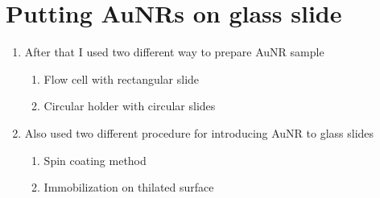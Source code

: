\documentclass[twoside,single]{lion-msc}
\begin{document}
  \section{Putting AuNRs on glass slide}
   \begin{enumerate}[I]
   \item After that I used two different way to prepare AuNR sample
   \begin{enumerate}[i]
   \item Flow cell with rectangular slide
   \item Circular holder with circular slides
   \end{enumerate}
   \item Also used two different procedure for introducing AuNR to glass slides
   \begin{enumerate}[i]
   \item Spin coating method 
   \item Immobilization on thilated surface
   \end{enumerate}
   \end{enumerate}
\end{document}
